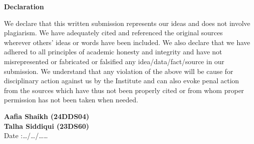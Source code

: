 \begin{center}
\thispagestyle{empty}
\LARGE{\textbf{Declaration}}\\[1cm]
\end{center}

We declare that this written submission represents our ideas and does not involve plagiarism. We have adequately cited and referenced the original sources wherever others’ ideas or words have been included. We also declare that we have adhered to all principles of academic honesty and integrity and have not misrepresented or fabricated or falsified any idea/data/fact/source in our submission. We understand that any violation of the above will be cause for disciplinary action against us by the Institute and can also evoke penal action from the sources which have thus not been properly cited or from whom proper permission has not been taken when needed. 

\vspace{1cm}
\noindent
\large{\textbf{Aafia Shaikh (24DDS04)} } \\ 
\hspace{0.1cm}\large{\textbf{Talha Siddiqui (23DS60)} } \\ 


\vspace{5cm}
Date :\hspace{0.2cm}\ldots/\ldots/\ldots\ldots




